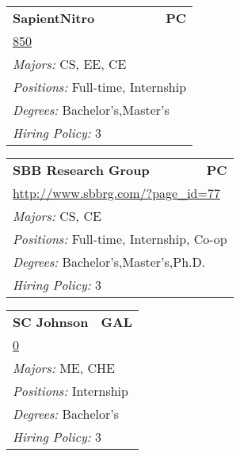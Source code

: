 \documentclass[twoside]{article}
\begin{document}
\begin{center}
\begin{multicols}{3}
\begin{FlushLeft}
\begin{minipage}{.9\columnwidth}
\end{minipage}
 
\begin{minipage}{.9\columnwidth}\begin{tabularx}{.95\columnwidth}{Xr}
                 {\Large\bf SapientNitro} & {\Large\bf PC}\\
    \multicolumn{2}{p{.95\columnwidth}}{\url{850}}\\
    \multicolumn{2}{p{.95\columnwidth}}{\emph{Majors:} CS, EE, CE}\\
    \multicolumn{2}{p{.95\columnwidth}}{\emph{Positions:} Full-time, Internship}\\
    \multicolumn{2}{p{.95\columnwidth}}{\emph{Degrees:} Bachelor's,Master's}\\
    \multicolumn{2}{p{.95\columnwidth}}{\emph{Hiring Policy:} 3}\\
    \end{tabularx}
    
\end{minipage}
 
\begin{minipage}{.9\columnwidth}\begin{tabularx}{.95\columnwidth}{Xr}
                 {\Large\bf SBB Research Group} & {\Large\bf PC}\\
    \multicolumn{2}{p{.95\columnwidth}}{\url{http://www.sbbrg.com/?page_id=77}}\\
    \multicolumn{2}{p{.95\columnwidth}}{\emph{Majors:} CS, CE}\\
    \multicolumn{2}{p{.95\columnwidth}}{\emph{Positions:} Full-time, Internship, Co-op}\\
    \multicolumn{2}{p{.95\columnwidth}}{\emph{Degrees:} Bachelor's,Master's,Ph.D.}\\
    \multicolumn{2}{p{.95\columnwidth}}{\emph{Hiring Policy:} 3}\\
    \end{tabularx}
    
\end{minipage}
 
\begin{minipage}{.9\columnwidth}\begin{tabularx}{.95\columnwidth}{Xr}
                 {\Large\bf SC Johnson} & {\Large\bf GAL}\\
    \multicolumn{2}{p{.95\columnwidth}}{\url{0}}\\
    \multicolumn{2}{p{.95\columnwidth}}{\emph{Majors:} ME, CHE}\\
    \multicolumn{2}{p{.95\columnwidth}}{\emph{Positions:} Internship}\\
    \multicolumn{2}{p{.95\columnwidth}}{\emph{Degrees:} Bachelor's}\\
    \multicolumn{2}{p{.95\columnwidth}}{\emph{Hiring Policy:} 3}\\
    \end{tabularx}
    

\end{minipage}
\end{FlushLeft}
\end{multicols}
\end{center}
\end{document}
